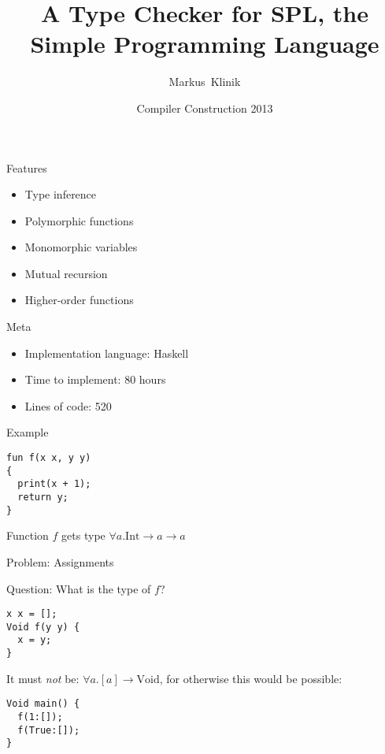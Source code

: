 \documentclass{beamer}
\title
{A Type Checker for SPL, the Simple Programming Language}
\author
{Markus~Klinik}
\institute[Radboud University Nijmegen]
{
  Radboud University Nijmegen
}
\date
{Compiler Construction 2013}
\newcommand{\arr}{\rightarrow}
\begin{document}
\begin{frame}
  \titlepage
\end{frame}

\begin{frame}{Features}

  \begin{itemize}
    \item Type inference
    \item Polymorphic functions
    \item Monomorphic variables
    \item Mutual recursion
    \item Higher-order functions
  \end{itemize}

\end{frame}

\begin{frame}{Meta}

  \begin{itemize}
    \item Implementation language: Haskell
    \item Time to implement: 80 hours
    \item Lines of code: 520
  \end{itemize}

\end{frame}


\begin{frame}[fragile]{Example}

\begin{verbatim}
fun f(x x, y y)
{
  print(x + 1);
  return y;
}
\end{verbatim}

Function $f$ gets type $\forall a . \text{Int} \arr a \arr a$

\end{frame}


\begin{frame}[fragile]{Problem: Assignments}

\onslide<+->

Question: What is the type of $f$?

\begin{verbatim}
x x = [];
Void f(y y) {
  x = y;
}
\end{verbatim}

\onslide<+->

It must \emph{not} be: $\forall a . [a] \arr \text{Void}$, for otherwise
this would be possible:

\begin{verbatim}
Void main() {
  f(1:[]);
  f(True:[]);
}
\end{verbatim}

\end{frame}
\end{document}
